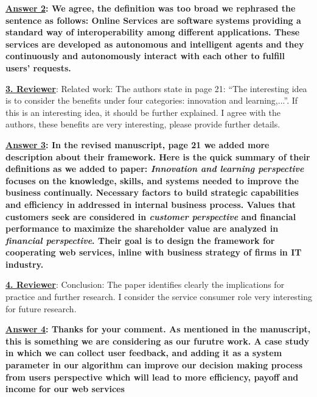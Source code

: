 \documentclass[times, 12pt,a4paper]{article}
\begin{document}
\vspace{0.2cm}\textbf{\underline{Answer 2}: We agree, the definition was too broad we rephrased
the sentence as follows: Online Services are software systems providing a standard way of
interoperability among different applications. These services are developed
 as autonomous and intelligent agents and they continuously and autonomously interact with each other to
fulfill users' requests.}

\vspace{0.5cm} \textbf{\underline{3. Reviewer}}: Related work: The authors state in page 21: ``The interesting idea is to consider the benefits under four categories: innovation and learning,...''. If this is an interesting idea, it should be further explained. I agree with the authors, these benefits are very interesting, please provide further details.

\vspace{0.2cm}\textbf{\underline{Answer 3}: In the revised manuscript, page 21 we added more description about their framework. Here is the quick summary of their definitions as we added to paper: \emph{Innovation and learning perspective} focuses on the knowledge, skills, and systems needed to improve the business continually. Necessary factors to build strategic capabilities and efficiency in addressed in internal business process. Values that customers seek are considered in \emph{customer perspective} and financial performance to maximize the shareholder value are analyzed in \emph{financial perspective}. Their goal is to design the framework for cooperating web services, inline with business strategy of firms in IT industry.}


\vspace{0.5cm} \textbf{\underline{4. Reviewer}}:  Conclusion: The paper identifies clearly the implications for practice and further research. I consider the service consumer role very interesting for future research.

\vspace{0.2cm}\textbf{\underline{Answer 4}: Thanks for your comment. As mentioned in the manuscript, this is something we are considering as our furutre work. A case study in which we can collect user feedback, and adding it as a system parameter in our algorithm can improve our decision making process from users perspective which will lead to more efficiency, payoff and income for our web services}
\end{document}
